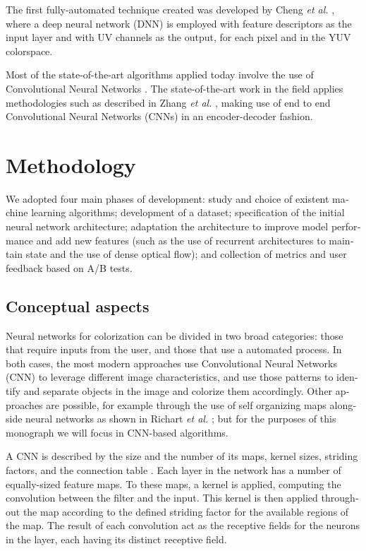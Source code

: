 \documentclass[12pt,openright,oneside,a4paper,english]{abntex2}
\begin{document}
\begin{otherlanguage}{english}
The first fully-automated technique created was developed by Cheng \textit{et al.} \cite{Cheng2015},
where a deep neural network (DNN) is employed with feature descriptors as the input layer and with UV channels as the output, for each pixel and in the YUV colorspace.

Most of the state-of-the-art algorithms applied today involve the use of Convolutional Neural Networks \cite{Larsson2016} \cite{Iizuka2016}. The state-of-the-art work in the field applies methodologies such as described in Zhang \textit{et al.} \cite{colorful}, making use of end to end Convolutional Neural Networks (CNNs) in an encoder-decoder fashion.



\chapter{Methodology}

We adopted four main phases of development: study and choice of existent machine learning algorithms; development of a dataset; specification of the initial neural network architecture; adaptation the architecture to improve model performance and add new features (such as the use of recurrent architectures to maintain state and the use of dense optical flow); and collection of metrics and user feedback based on A/B tests.

\section{Conceptual aspects} \label{sec:Concept}
Neural networks for colorization can be divided in two broad categories: those that require inputs from the user, and those that use a automated process. In both cases, the most modern approaches use Convolutional Neural Networks (CNN) to leverage different image characteristics, and use those patterns to identify and separate objects in the image and colorize them accordingly. Other approaches are possible, for example through the use of self organizing maps alongside neural networks as shown in Richart \textit{et al.} \cite{Richart_som_nn}; but for the purposes of this monograph we will focus in CNN-based algorithms.

A CNN is described by the size and the number of its maps, kernel sizes, striding factors, and the connection table \cite{Ciresan2011}. Each layer in the network has a number of equally-sized feature maps. To these maps, a kernel is applied, computing the convolution between the filter and the input. This kernel is then applied throughout the map according to the defined striding factor for the available regions of the map. The result of each convolution act as the receptive fields for the neurons in the layer, each having its distinct receptive field.


\end{otherlanguage}
\end{document}
